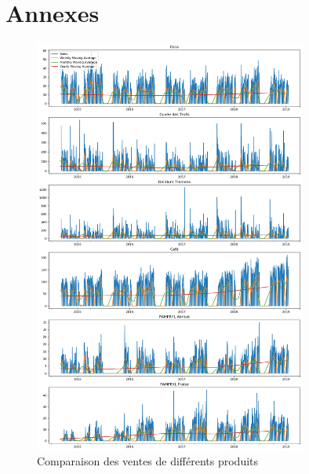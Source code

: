 \section{Annexes}
\label{sec:appendix}

\begin{figure}[h]
	\centering
	\includegraphics[width=0.8\textwidth]{figures/products_sales_comparison.png}
	\caption{Comparaison des ventes de différents produits}
    \label{fig:products_sales_comparison}
\end{figure}


